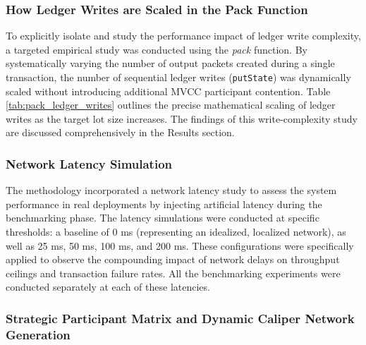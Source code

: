 ﻿\documentclass[12pt]{article}
\begin{document}
\subsubsection{How Ledger Writes are Scaled in the Pack Function}
To explicitly isolate and study the performance impact of ledger write complexity, a targeted empirical study was conducted using the \textit{pack} function. By systematically varying the number of output packets created during a single transaction, the number of sequential ledger writes (\texttt{putState}) was dynamically scaled without introducing additional MVCC participant contention. Table \ref{tab:pack_ledger_writes} outlines the precise mathematical scaling of ledger writes as the target lot size increases. The findings of this write-complexity study are discussed comprehensively in the Results section.
\begin{table}[H]
\centering
\caption{Ledger Write Complexity Scaling based on Target Lot Size}
\label{tab:pack_ledger_writes}
\end{table}

\subsubsection{Network Latency Simulation}
The methodology incorporated a network latency study to assess the system performance in real deployments by injecting artificial latency during the benchmarking phase. The latency simulations were conducted at specific thresholds: a baseline of 0 ms (representing an idealized, localized network), as well as  25 ms, 50 ms, 100 ms, and 200 ms. These configurations were specifically applied to observe the compounding impact of network delays on throughput ceilings and transaction failure rates. All the benchmarking experiments were conducted separately at each of these latencies.

\subsubsection{Strategic Participant Matrix and Dynamic Caliper Network Generation}
\end{document}

